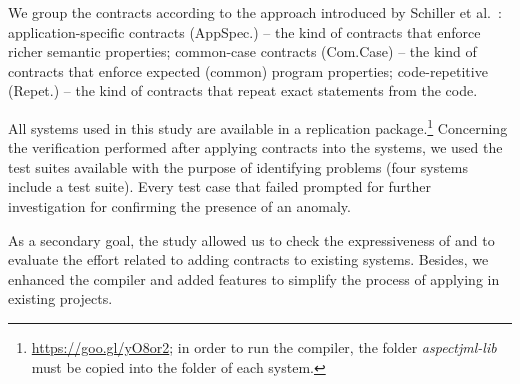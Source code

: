 We group the contracts according to
the approach introduced by Schiller et al.~\cite{typeContracts}: application-specific contracts
(AppSpec.) -- the kind of contracts that enforce richer semantic properties;
 common-case contracts (Com.Case) -- the kind of contracts that enforce
expected (common) program properties;
code-repetitive (Repet.) -- the kind of
contracts that repeat exact statements from the code.

All systems used in this study are available in a replication
package.\footnote{\url{https://goo.gl/yO8or2}; in order to run the
\contractjdoc{} compiler, the folder \textit{aspectjml-lib} must be copied into the folder of each system.}
Concerning the verification performed after applying \contractjdoc{} contracts into the systems,
we used the test suites available with the purpose of identifying problems
(four systems include a test suite).
Every test case that failed prompted for further investigation for confirming the presence of an anomaly.

As a secondary goal, the study allowed us to check the expressiveness of \contractjdoc{} and to
evaluate the effort related to adding contracts to existing systems.
Besides, we enhanced the compiler and added features to simplify
the process of applying \contractjdoc{} in existing projects.

